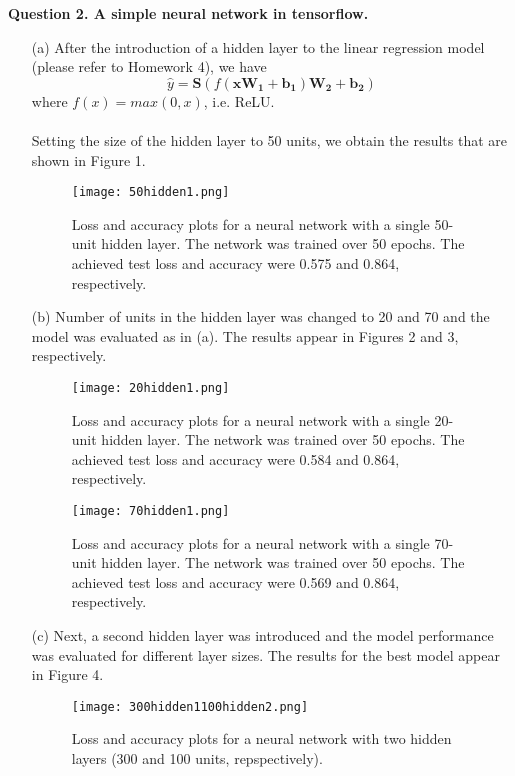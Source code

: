 \documentclass[12pt]{article}
\begin{document}
\noindent
\noindent\textbf{Question 2. A simple neural network in tensorflow.}
\begin{enumerate}
    \item[(a)] After the introduction of a hidden layer to the linear regression model (please refer to Homework 4),
    we have
    \[
      \hat{y} = \boldsymbol{S}\left(f\left(\boldsymbol{xW_{1}} + \boldsymbol{b_{1}}\right)\boldsymbol{W_{2}} + \boldsymbol{b_{2}}\right)
    \] 
    where $f(x)=max(0, x)$, i.e. ReLU.\\
    \\
    Setting the size of the hidden layer to 50 units, we obtain the results that are shown in Figure 1.
    \begin{figure}[h]
        \centering
        \texttt{[image: 50hidden1.png]}
        \caption{Loss and accuracy plots for a neural network with a single 50-unit hidden layer. 
        The network was trained over 50 epochs. The achieved test loss and accuracy were 0.575 and 0.864, respectively.}
    \end{figure}
    \item[(b)] Number of units in the hidden layer was changed to 20 and 70 and the model was evaluated as in (a). The results appear in Figures 2 and 3, respectively.
    \begin{figure}[h!]
        \centering
        \texttt{[image: 20hidden1.png]}
        \caption{Loss and accuracy plots for a neural network with a single 20-unit hidden layer. 
        The network was trained over 50 epochs. The achieved test loss and accuracy were 0.584 and 0.864, respectively.}
    \end{figure}
    \begin{figure}[h!]
        \centering
        \texttt{[image: 70hidden1.png]}
        \caption{Loss and accuracy plots for a neural network with a single 70-unit hidden layer. 
        The network was trained over 50 epochs. The achieved test loss and accuracy were 0.569 and 0.864, respectively.}
    \end{figure}
    \item[(c)] Next, a second hidden layer was introduced and the model performance was evaluated for different layer sizes. The results for the best model appear in Figure 4.
    \begin{figure}[h!]
        \centering
        \texttt{[image: 300hidden1100hidden2.png]}
        \caption{Loss and accuracy plots for a neural network with two hidden layers (300 and 100 units, repspectively). 
}
\end{figure}
\end{enumerate}
\end{document}
